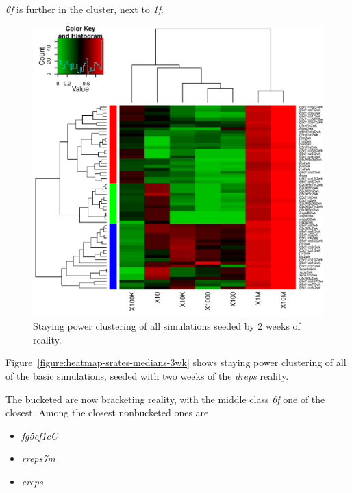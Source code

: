 \documentclass[10pt,oneside]{memoir}
\begin{document}
\begin{Spacing}{2}
\begin{itemize}
{\itshape 6f} is further in the cluster, next to {\itshape 1f}.



\end{itemize}


\begin{figure}
\begin{center}
    \includegraphics{figures/heatmap-srates-medians-2wk}
    \caption{Staying power clustering of all simulations seeded by 2 weeks of reality.}
    \label{figure:heatmap-srates-medians-2wk}
\end{center}
\end{figure}
Figure~\ref{figure:heatmap-srates-medians-3wk} shows staying power clustering of all of the basic simulations, seeded with two weeks of the {\itshape dreps} reality.


The bucketed are now bracketing reality, with the middle class {\itshape 6f} one of the closest.  Among the closest nonbucketed ones are


\begin{itemize}


\item {\itshape fg5cf1cC}

\item {\itshape rreps7m}

\item {\itshape ereps}
\end{itemize}


\end{Spacing}
\end{document}
